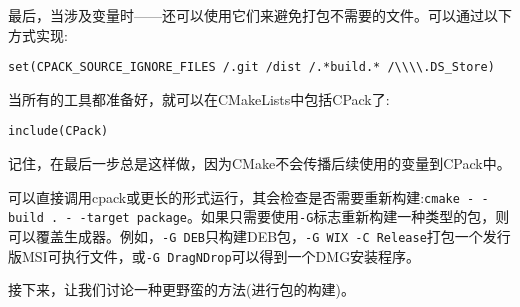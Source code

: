 最后，当涉及变量时——还可以使用它们来避免打包不需要的文件。可以通过以下方式实现:

\begin{lstlisting}[style=styleCMake]
set(CPACK_SOURCE_IGNORE_FILES /.git /dist /.*build.* /\\\\.DS_Store)
\end{lstlisting}

当所有的工具都准备好，就可以在CMakeLists中包括CPack了:

\begin{lstlisting}[style=styleCMake]
include(CPack)
\end{lstlisting}

记住，在最后一步总是这样做，因为CMake不会传播后续使用的变量到CPack中。

可以直接调用cpack或更长的形式运行，其会检查是否需要重新构建:\texttt{cmake -\,-build . -\,-target package}。如果只需要使用\texttt{-G}标志重新构建一种类型的包，则可以覆盖生成器。例如，\texttt{-G DEB}只构建DEB包，\texttt{-G WIX -C Release}打包一个发行版MSI可执行文件，或\texttt{-G DragNDrop}可以得到一个DMG安装程序。

接下来，让我们讨论一种更野蛮的方法(进行包的构建)。
